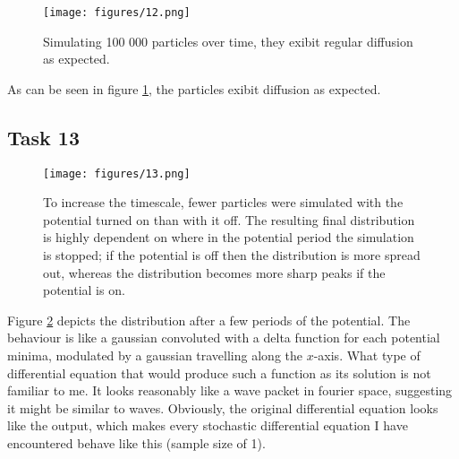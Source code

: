 \begin{figure}
    \centering
    \texttt{[image: figures/12.png]}
    \caption{
        Simulating 100 000 particles over time, they exibit regular 
        diffusion as expected.
    }
    \label{fig:12}
\end{figure}

As can be seen in figure \ref{fig:12}, the particles exibit diffusion as expected.

\subsection*{Task 13}

\begin{figure}
    \centering
    \texttt{[image: figures/13.png]}
    \caption{
        To increase the timescale, fewer particles were simulated 
        with the potential turned on than with it off. 
        The resulting final distribution is highly dependent on where in
        the potential period the simulation is stopped; if the potential 
        is off then the distribution is more spread out,
        whereas the distribution becomes more sharp peaks if the potential is on.
    }
    \label{fig:13}
\end{figure}

Figure \ref{fig:13} depicts the distribution after a few periods of the 
potential. The behaviour is like a gaussian convoluted with a delta function
for each potential minima, modulated by a gaussian travelling along the $x$-axis.
What type of differential equation that would produce such a function as its
solution is not familiar to me. 
It looks reasonably like a wave packet in fourier space, 
suggesting it might be similar to waves. 
Obviously, the original differential equation looks like the output, 
which makes every stochastic differential equation I have encountered behave like this
(sample size of 1).
